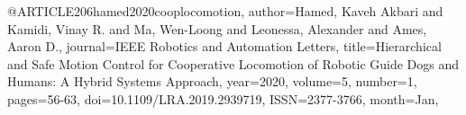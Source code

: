 @ARTICLE{206hamed2020cooplocomotion,
author={Hamed, Kaveh Akbari and Kamidi, Vinay R. and Ma, Wen-Loong and Leonessa, Alexander and Ames, Aaron D.},
journal={IEEE Robotics and Automation Letters}, 
title={Hierarchical and Safe Motion Control for Cooperative Locomotion of Robotic Guide Dogs and Humans: A Hybrid Systems Approach}, 
year={2020},
volume={5},
number={1},
pages={56-63},
doi={10.1109/LRA.2019.2939719},
ISSN={2377-3766},
month={Jan},}